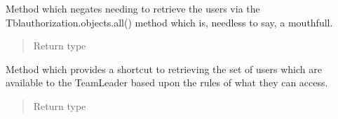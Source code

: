 \documentclass[letterpaper,10pt,english]{sphinxmanual}
\begin{document}
\begin{fulllineitems}
\begin{fulllineitems}
\begin{quote}
\begin{description}
\end{description}\end{quote}

\end{fulllineitems}


\begin{fulllineitems}
\label{timetracker:timetracker.tracker.models.Tblauthorization.manager_view}
Method which negates needing to retrieve the users via the
Tblauthorization.objects.all() method which is, needless to say, a
mouthfull.
\begin{quote}\begin{description}
\item[{Return type}] \leavevmode
{}

\end{description}\end{quote}

\end{fulllineitems}


\begin{fulllineitems}
\label{timetracker:timetracker.tracker.models.Tblauthorization.teamleader_view}
Method which provides a shortcut to retrieving the set of users which
are available to the TeamLeader based upon the rules of what they can
access.
\begin{quote}\begin{description}
\item[{Return type}] \leavevmode
{}

\end{description}\end{quote}

\end{fulllineitems}


\end{fulllineitems}

\end{document}
